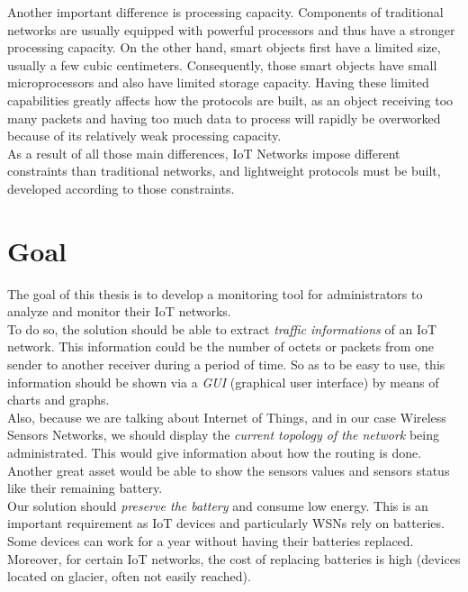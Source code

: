 Another important difference is processing capacity. Components of traditional networks are usually equipped with powerful processors and thus have a stronger processing capacity. On the other hand, smart objects first have a limited size, usually a few cubic centimeters. Consequently, those smart objects have small microprocessors and also have limited storage capacity. Having these limited capabilities greatly affects how the protocols are built, as an object receiving too many packets and having too much data to process will rapidly be overworked because of its relatively weak processing capacity. \\

As a result of all those main differences, IoT Networks impose different constraints than traditional networks, and lightweight protocols must be built, developed according to those constraints.

\section*{Goal}

The goal of this thesis is to develop a monitoring tool for administrators to analyze and monitor their IoT networks.\\

To do so, the solution should be able to extract \textit{traffic informations} of an IoT network. This information could be the number of octets or packets from one sender to another receiver during a period of time. So as to be easy to use, this information should be shown via a \textit{GUI} (graphical user interface) by means of charts and graphs. \\

Also, because we are talking about Internet of Things, and in our case Wireless Sensors Networks, we should display the \textit{current topology of the network} being administrated. This would give information about how the routing is done. Another great asset would be able to show the sensors values and sensors status like their remaining battery.\\

Our solution should \textit{preserve the battery} and consume low energy. This is an important requirement as IoT devices and particularly WSNs rely on batteries. Some devices can work for a year without having their batteries replaced. Moreover, for certain IoT networks, the cost of replacing batteries is high (devices located on glacier, often not easily reached).\\

